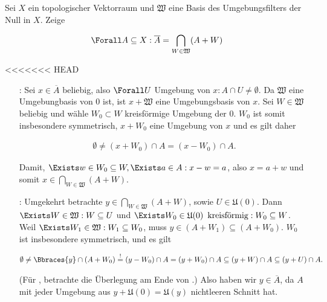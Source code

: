 \begin{exercise}

Sei $X$ ein topologischer Vektorraum und $\mathfrak{W}$ eine Basis des Umgebungsfilters der Null in $X$.
Zeige

\begin{align*}
  \Forall A \subseteq X:
  \overline{A}
  =
  \bigcap_{W \in \mathfrak{W}} (A + W)
\end{align*}

\end{exercise}

\begin{solution}

<<<<<<< HEAD
\phantom{}

\begin{itemize}

  \item[\Quote{$\subseteq$}:]
  Sei $x \in \overline{A}$ beliebig, also $\Forall U$ Umgebung von $x: A \cap U \neq \emptyset$.
  Da $\mathfrak{W}$ eine Umgebungbasis von $0$ ist, ist $x + \mathfrak{W}$ eine Umgebungsbasis von $x$.
  Sei $W \in \mathfrak{W}$ beliebig und wähle $W_0 \subset W$ kreisförmige Umgebung der $0$.
  $W_0$ ist somit insbesondere symmetrisch, $x + W_0$ eine Umgebung von $x$ und es gilt daher

  \begin{align*}
    \emptyset
    \neq
    (x + W_0) \cap A
    =
    (x - W_0) \cap A.
  \end{align*}

  Damit, $\Exists w \in W_0 \subseteq W, \Exists a \in A: x - w = a$, also $x = a + w$ und somit $x \in \bigcap_{W \in \mathfrak{W}}(A + W)$.

  \item[\Quote{$\supseteq$}:]
  Umgekehrt betrachte $y \in \bigcap_{W \in \mathfrak{W}}(A + W)$, sowie $ U \in \mathfrak{U}(0)$.
  Dann $\Exists W \in \mathfrak{W}: W \subseteq U$ und $\Exists W_0 \in \mathfrak{U}(0) \enspace \text{kreisförmig}: W_0 \subseteq W$.
  Weil $\Exists W_1 \in \mathfrak{W}: W_1 \subseteq W_0$, muss $y \in (A + W_1) \subseteq (A + W_0)$.
  $W_0$ ist insbesondere symmetrisch, und es gilt

  \begin{align*}
    \emptyset
    \neq
    \Bbraces{y} \cap (A + W_0)
    \stackrel{!}{=}
    (y - W_0) \cap A = (y + W_0) \cap A
    \subseteq
    (y + W) \cap A
    \subseteq
    (y + U) \cap A.
  \end{align*}

  (Für \Quote{!}, betrachte die Überlegung am Ende von \Quote{$\subseteq$}.)
  Also haben wir $y \in \overline{A}$, da $A$ mit jeder Umgebung aus $y + \mathfrak{U}(0) = \mathfrak{U}(y)$ nichtleeren Schnitt hat.


\end{itemize}
\end{solution}
